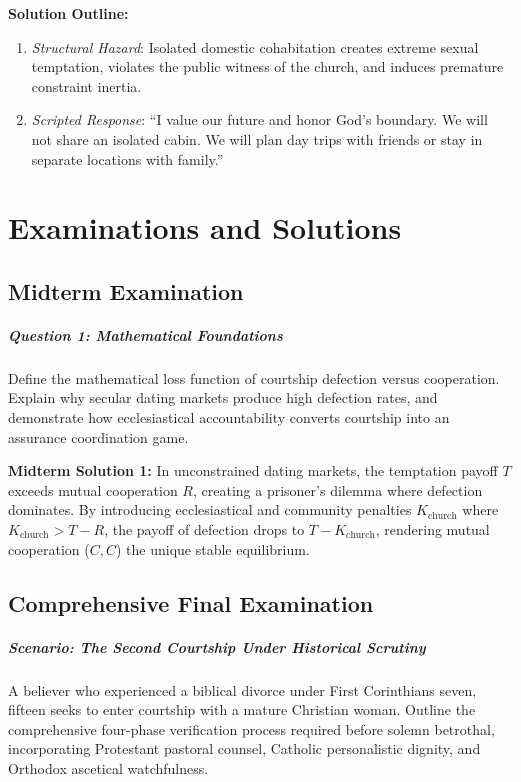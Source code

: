 \documentclass[11pt]{report}
\begin{document}
\begin{blackboard}
\textbf{Solution Outline:}
\begin{enumerate}
    \item \textit{Structural Hazard}: Isolated domestic cohabitation creates extreme sexual temptation, violates the public witness of the church, and induces premature constraint inertia.
    \item \textit{Scripted Response}: ``I value our future and honor God's boundary. We will not share an isolated cabin. We will plan day trips with friends or stay in separate locations with family.''
\end{enumerate}
\end{blackboard}

\chapter{Examinations and Solutions}

\section{Midterm Examination}

\paragraph{Question 1: Mathematical Foundations}
Define the mathematical loss function of courtship defection versus cooperation. Explain why secular dating markets produce high defection rates, and demonstrate how ecclesiastical accountability converts courtship into an assurance coordination game.

\begin{blackboard}
\textbf{Midterm Solution 1:}
In unconstrained dating markets, the temptation payoff $T$ exceeds mutual cooperation $R$, creating a prisoner's dilemma where defection dominates. By introducing ecclesiastical and community penalties $K_{\text{church}}$ where $K_{\text{church}} > T - R$, the payoff of defection drops to $T - K_{\text{church}}$, rendering mutual cooperation ($C, C$) the unique stable equilibrium.
\end{blackboard}

\section{Comprehensive Final Examination}

\paragraph{Scenario: The Second Courtship Under Historical Scrutiny}
A believer who experienced a biblical divorce under First Corinthians seven, fifteen seeks to enter courtship with a mature Christian woman. Outline the comprehensive four-phase verification process required before solemn betrothal, incorporating Protestant pastoral counsel, Catholic personalistic dignity, and Orthodox ascetical watchfulness.
\end{document}
